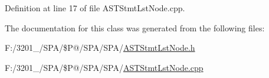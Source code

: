 Definition at line 17 of file A\-S\-T\-Stmt\-Lst\-Node.\-cpp.



The documentation for this class was generated from the following files\-:\begin{DoxyCompactItemize}
\item 
F\-:/3201\-\_/\-S\-P\-A/\$\-P@/\-S\-P\-A/\-S\-P\-A/\hyperlink{_a_s_t_stmt_lst_node_8h}{A\-S\-T\-Stmt\-Lst\-Node.\-h}\item 
F\-:/3201\-\_/\-S\-P\-A/\$\-P@/\-S\-P\-A/\-S\-P\-A/\hyperlink{_a_s_t_stmt_lst_node_8cpp}{A\-S\-T\-Stmt\-Lst\-Node.\-cpp}\end{DoxyCompactItemize}
